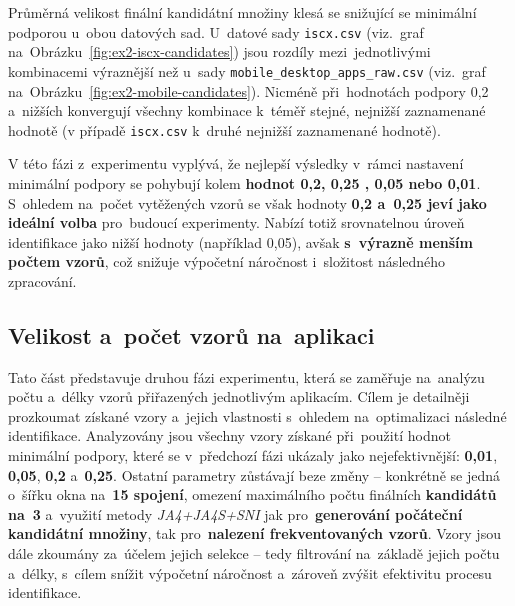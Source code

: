 Průměrná velikost finální kandidátní množiny klesá se snižující se minimální podporou u~obou datových sad. U~datové sady \texttt{iscx.csv} (viz.~graf na~Obrázku~\ref{fig:ex2-iscx-candidates}) jsou rozdíly mezi~jednotlivými kombinacemi výraznější než u~sady \texttt{mobile\_desktop\_apps\_raw.csv} (viz.~graf na~Obrázku~\ref{fig:ex2-mobile-candidates}). Nicméně při~hodnotách podpory 0{,}2 a~nižších konvergují všechny kombinace k~téměř stejné, nejnižší zaznamenané hodnotě (v případě \texttt{iscx.csv} k~druhé nejnižší zaznamenané hodnotě).

V této fázi z~experimentu vyplývá, že nejlepší výsledky v~rámci nastavení minimální podpory se pohybují kolem \textbf{hodnot 0{,}2, 0{,}25 , 0{,}05 nebo 0{,}01}. S~ohledem na~počet vytěžených vzorů se však hodnoty \textbf{0{,}2 a~0{,}25 jeví jako ideální volba} pro~budoucí experimenty. Nabízí totiž srovnatelnou úroveň identifikace jako nižší hodnoty (například 0{,}05), avšak \textbf{s~výrazně menším počtem vzorů}, což snižuje výpočetní náročnost i~složitost následného zpracování.

\subsection{Velikost a~počet vzorů na~aplikaci}
\label{ex-filters}
Tato část představuje druhou fázi experimentu, která se zaměřuje na~analýzu počtu a~délky vzorů přiřazených jednotlivým aplikacím. Cílem je detailněji prozkoumat získané vzory a~jejich vlastnosti s~ohledem na~optimalizaci následné identifikace. Analyzovány jsou všechny vzory získané při~použití hodnot minimální podpory, které se v~předchozí fázi ukázaly jako nejefektivnější: \textbf{0{,}01}, \textbf{0{,}05}, \textbf{0{,}2} a~\textbf{0{,}25}. Ostatní parametry zůstávají beze změny – konkrétně se jedná o~šířku okna na~\textbf{15 spojení}, omezení maximálního počtu finálních \textbf{kandidátů na~3} a~využití metody \textit{JA4+JA4S+SNI} jak pro~\textbf{generování počáteční kandidátní množiny}, tak pro~\textbf{nalezení frekventovaných vzorů}. Vzory jsou dále zkoumány za~účelem jejich selekce -- tedy filtrování na~základě jejich počtu a~délky, s~cílem snížit výpočetní náročnost a~zároveň zvýšit efektivitu procesu identifikace.

